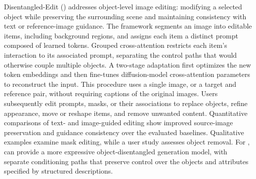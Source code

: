 Disentangled-Edit (\dedit{}) addresses object-level image editing: modifying a selected object while preserving the surrounding scene and maintaining consistency with text or reference-image guidance. The framework segments an image into editable items, including background regions, and assigns each item a distinct prompt composed of learned tokens. Grouped cross-attention restricts each item's interaction to its associated prompt, separating the control paths that would otherwise couple multiple objects. A two-stage adaptation first optimizes the new token embeddings and then fine-tunes diffusion-model cross-attention parameters to reconstruct the input. This procedure uses a single image, or a target and reference pair, without requiring captions of the original images. Users subsequently edit prompts, masks, or their associations to replace objects, refine appearance, move or reshape items, and remove unwanted content. Quantitative comparisons of text- and image-guided editing show improved source-image preservation and guidance consistency over the evaluated baselines. Qualitative examples examine mask editing, while a user study assesses object removal. For \prism{}, \dedit{} can provide a more expressive object-disentangled generation model, with separate conditioning paths that preserve control over the objects and attributes specified by structured descriptions.
